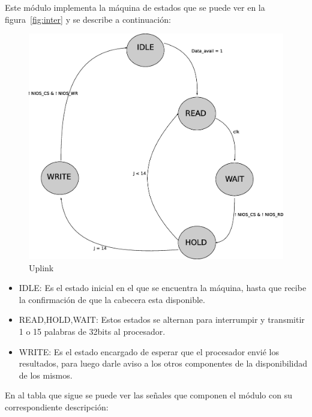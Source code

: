 Este módulo implementa la máquina de estados que se puede ver en la figura~\ref{fig:inter} y se describe a continuación:

\begin{figure}[H]
  \centering
	\includegraphics[scale=0.45]{3-arquitectura/graf/estuplinkcompleto.eps}
  \caption{Uplink}
  \label{fig:estuplink}
\end{figure}

\begin{itemize}
	\item IDLE: Es el estado inicial en el que se encuentra la máquina, hasta que recibe la confirmación de que la cabecera esta disponible.
	\item READ,HOLD,WAIT: Estos estados se alternan para interrumpir y transmitir 1 o 15 palabras de 32bits al procesador.
	\item WRITE: Es el estado encargado de esperar que el procesador envié los resultados, para luego darle aviso a los otros componentes de la disponibilidad de los mismos.
\end{itemize}

En al tabla que sigue se puede ver las señales que componen el módulo con su correspondiente descripción:

